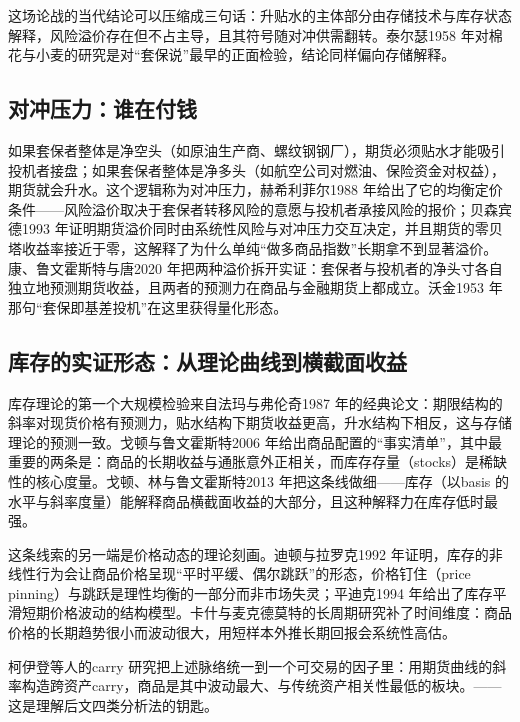 \documentclass[12pt,a4paper]{ctexart}
\begin{document}
这场论战的当代结论可以压缩成三句话：升贴水的主体部分由存储技术与库存状态解释，风险溢价存在但不占主导，且其符号随对冲供需翻转。泰尔瑟1958 年对棉花与小麦的研究是对“套保说”最早的正面检验，结论同样偏向存储解释\cite{07}。

\subsection{对冲压力：谁在付钱}

如果套保者整体是净空头（如原油生产商、螺纹钢钢厂），期货必须贴水才能吸引投机者接盘；如果套保者整体是净多头（如航空公司对燃油、保险资金对权益），期货就会升水。这个逻辑称为对冲压力，赫希利菲尔1988 年给出了它的均衡定价条件——风险溢价取决于套保者转移风险的意愿与投机者承接风险的报价\cite{09}；贝森宾德1993 年证明期货溢价同时由系统性风险与对冲压力交互决定，并且期货的零贝塔收益率接近于零，这解释了为什么单纯“做多商品指数”长期拿不到显著溢价\cite{10}。康、鲁文霍斯特与唐2020 年把两种溢价拆开实证：套保者与投机者的净头寸各自独立地预测期货收益，且两者的预测力在商品与金融期货上都成立\cite{38}。沃金1953 年那句“套保即基差投机”在这里获得量化形态\cite{04}。

\subsection{库存的实证形态：从理论曲线到横截面收益}

库存理论的第一个大规模检验来自法玛与弗伦奇1987 年的经典论文：期限结构的斜率对现货价格有预测力，贴水结构下期货收益更高，升水结构下相反，这与存储理论的预测一致\cite{08}。戈顿与鲁文霍斯特2006 年给出商品配置的“事实清单”，其中最重要的两条是：商品的长期收益与通胀意外正相关，而库存存量（stocks）是稀缺性的核心度量\cite{11}。戈顿、林与鲁文霍斯特2013 年把这条线做细——库存（以basis 的水平与斜率度量）能解释商品横截面收益的大部分，且这种解释力在库存低时最强\cite{12}。

这条线索的另一端是价格动态的理论刻画。迪顿与拉罗克1992 年证明，库存的非线性行为会让商品价格呈现“平时平缓、偶尔跳跃”的形态，价格钉住（price pinning）与跳跃是理性均衡的一部分而非市场失灵\cite{14}；平迪克1994 年给出了库存平滑短期价格波动的结构模型\cite{15}。卡什与麦克德莫特的长周期研究补了时间维度：商品价格的长期趋势很小而波动很大，用短样本外推长期回报会系统性高估\cite{16}。

柯伊登等人的carry 研究把上述脉络统一到一个可交易的因子里：用期货曲线的斜率构造跨资产carry，商品是其中波动最大、与传统资产相关性最低的板块\cite{13}。——这是理解后文四类分析法的钥匙。
\end{document}
